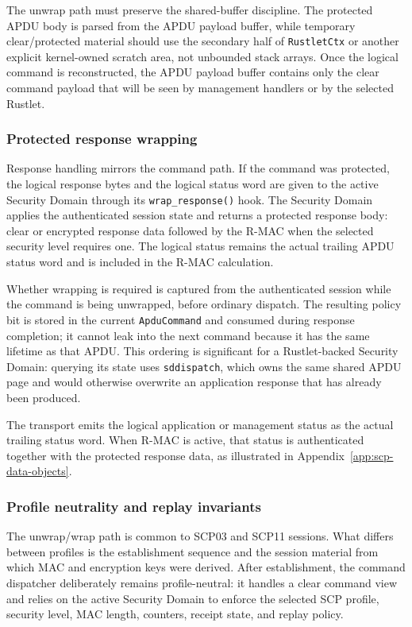 The unwrap path must preserve the shared-buffer discipline. The protected APDU
body is parsed from the APDU payload buffer, while temporary clear/protected
material should use the secondary half of \texttt{RustletCtx} or another
explicit kernel-owned scratch area, not unbounded stack arrays. Once the
logical command is reconstructed, the APDU payload buffer contains only the
clear command payload that will be seen by management handlers or by the
selected Rustlet.

\subsubsection{Protected response wrapping}

Response handling mirrors the command path. If the command was protected, the
logical response bytes and the logical status word are given to the active
Security Domain through its \texttt{wrap\_response()} hook. The Security Domain
applies the authenticated session state and returns a protected response body:
clear or encrypted response data followed by the R-MAC when the selected
security level requires one. The logical status remains the actual trailing
APDU status word and is included in the R-MAC calculation.

Whether wrapping is required is captured from the authenticated session while
the command is being unwrapped, before ordinary dispatch. The resulting policy
bit is stored in the current \texttt{ApduCommand} and consumed during response
completion; it cannot leak into the next command because it has the same
lifetime as that APDU. This ordering is significant for a Rustlet-backed
Security Domain: querying its state uses \texttt{sddispatch}, which owns the
same shared APDU page and would otherwise overwrite an application response
that has already been produced.

The transport emits the logical application or management status as the
actual trailing status word. When R-MAC is active, that status is
authenticated together with the protected response data, as illustrated in
Appendix~\ref{app:scp-data-objects}.

\subsubsection{Profile neutrality and replay invariants}

The unwrap/wrap path is common to SCP03 and SCP11 sessions. What differs
between profiles is the establishment sequence and the session material from
which MAC and encryption keys were derived. After establishment, the command
dispatcher deliberately remains profile-neutral: it handles a clear command
view and relies on the active Security Domain to enforce the selected SCP
profile, security level, MAC length, counters, receipt state, and replay
policy.

